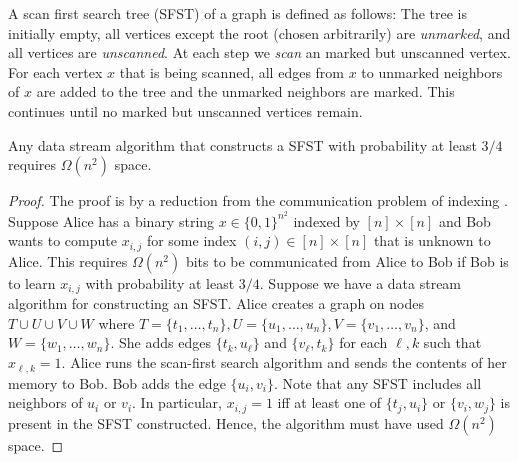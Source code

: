 A scan first search tree (SFST) of a graph \cite{CheriyanKT93} is defined as follows: The tree is initially empty, all vertices except the root (chosen arbitrarily) are \emph{unmarked}, and 
 all vertices are \emph{unscanned}. At each step we \emph{scan} an marked but unscanned vertex. For each vertex $x$ that is being scanned, all edges from $x$ to unmarked neighbors of $x$ are added to the tree and the unmarked neighbors are marked. This continues until no marked but unscanned vertices remain.

\begin{theorem}
Any data stream algorithm that constructs a SFST with probability at least $3/4$ requires $\Omega(n^2)$ space.
\end{theorem}
\begin{proof}
The proof is by a reduction from the communication problem of indexing \cite{Ablayev96}. Suppose Alice has a binary string $x\in \{0,1\}^{n^2}$ indexed by $[n]\times [n]$ and Bob wants to compute $x_{i,j}$ for some index $(i,j)\in [n]\times [n]$ that is unknown to Alice. This requires $\Omega(n^2)$ bits to be communicated from Alice to Bob if Bob is to learn $x_{i,j}$ with probability at least $3/4$.
Suppose we have a data stream algorithm for constructing an SFST. Alice creates a graph on nodes $T\cup U\cup V \cup W$ where $T=\{t_1, \ldots, t_n\}, U=\{u_1, \ldots, u_n\}, V=\{v_1, \ldots, v_n\}$, and $W=\{w_1, \ldots, w_n\}$. She adds edges $\{t_k,u_\ell\}$ and $\{v_\ell,t_k\}$ for each $\ell,k$ such that $x_{\ell,k}=1$.  Alice runs the scan-first search algorithm and sends the contents of her memory to Bob. Bob adds the edge $\{u_i,v_i\}$. Note that any SFST includes all neighbors of $u_i$ or $v_i$. In particular, $x_{i,j}=1$ iff at least one of $\{t_j,u_i\}$ or $\{v_i,w_j\}$ is present in the SFST constructed. Hence, the algorithm must have used $\Omega(n^2)$ space.
\end{proof}